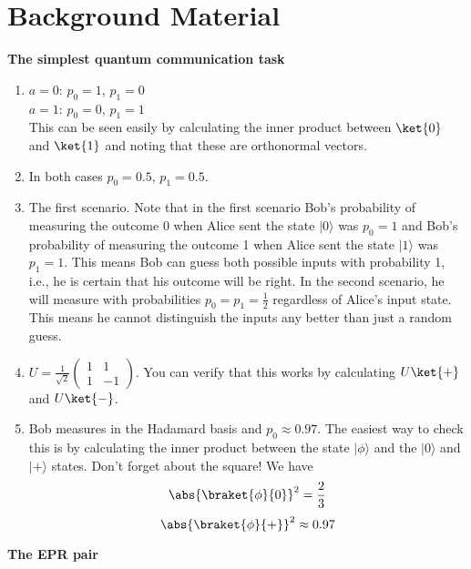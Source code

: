 
\chapter{Background Material}

\begin{exercises}
	
	
\item {\bf The simplest quantum communication task}
\begin{enumerate}
\item 
$a=0$: $p_0=1$, $p_1=0$\\
$a=1$: $p_0=0$, $p_1=1$\\
This can be seen easily by calculating the inner product between $\ket{0}$ and $\ket{1}$ and noting that these are orthonormal vectors.

\item In both cases $p_0=0.5$, $p_1=0.5$.

\item The first scenario. Note that in the first scenario Bob's probability of measuring the outcome 0 when Alice sent the state \(|0\rangle\) was \(p_0=1\) and Bob's probability of measuring the outcome 1 when Alice sent the state \(|1\rangle\) was \(p_1=1\). This means Bob can guess both possible inputs with probability 1, i.e., he is certain that his outcome will be right. In the second scenario, he will measure with probabilities \(p_0=p_1=\frac{1}{2}\) regardless of Alice's input state. This means he cannot distinguish the inputs any better than just a random guess.

\item $U=\frac{1}{\sqrt{2}}\begin{pmatrix} 1 & 1 \\ 1 & -1 \end{pmatrix}$. You can verify that this works by calculating $U\ket{+}$ and $U\ket{-}$.

\item Bob measures in the Hadamard basis and $p_0\approx 0.97$. The easiest way to check this is by calculating the inner product between the state \(|\phi\rangle\) and the \(|0\rangle\) and \(|+\rangle\) states. Don't forget about the square! We have
$$\abs{\braket{\phi}{0}}^2 = \frac{2}{3}$$
    $$\abs{\braket{\phi}{+}}^2 \approx 0.97$$
\end{enumerate}


\item {\bf The EPR pair}



\end{exercises}
